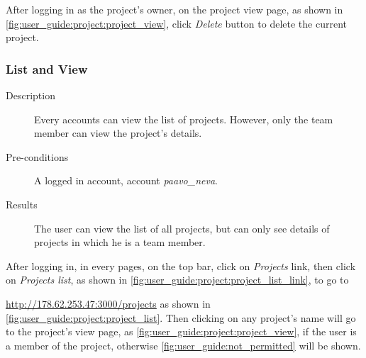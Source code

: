 After logging in as the project's owner, on the project view page, as shown in \autoref{fig:user_guide:project:project_view}, click \emph{Delete} button to delete the current project. 

\subsubsection{List and View}
\label{ch:result:user_guide:project:list}

\begin{description}
\item[Description] Every accounts can view the list of projects. However, only the team member can view the project's details.
\item[Pre-conditions] A logged in account, \eg account \emph{paavo\_neva}.
\item[Results] The user can view the list of all projects, but can only see details of projects in which he is a team member.
\end{description}

After logging in, in every pages, on the top bar, click on \emph{Projects} link, then click on \emph{Projects list}, as shown in \autoref{fig:user_guide:project:project_list_link}, to go to 

\noindent\href{http://178.62.253.47:3000/projects}{http://178.62.253.47:3000/projects} as shown in \autoref{fig:user_guide:project:project_list}.
Then clicking on any project's name will go to the project's view page, as \autoref{fig:user_guide:project:project_view}, if the user is a member of the project, otherwise \autoref{fig:user_guide:not_permitted} will be shown.

